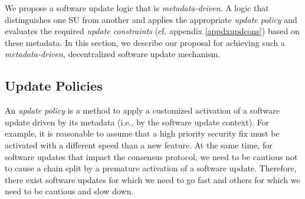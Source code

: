 We propose a software update logic that is \emph{metadata-driven}. A logic that distinguishes one SU from another and applies the appropriate \emph{update policy} and evaluates the required \emph{update constraints} (cf. appendix \ref{appdxupdcons}) based on these metadata. 
In this section, we describe our proposal for achieving such a \emph{metadata-driven}, decentralized software update mechanism.



\subsection{Update Policies} 

An \emph{update policy} is a method to apply a customized activation of a software update driven by its metadata (i.e., by the software update context). For example, it is reasonable to assume that a high priority security fix must be activated with a different speed than a  new feature. At the same time, for software updates that impact the consensus protocol, we need to be cautious not to cause a chain split by a premature activation of a software update. Therefore, there exist software updates for which we need to go fast and others for which we need to be cautious and slow down.

